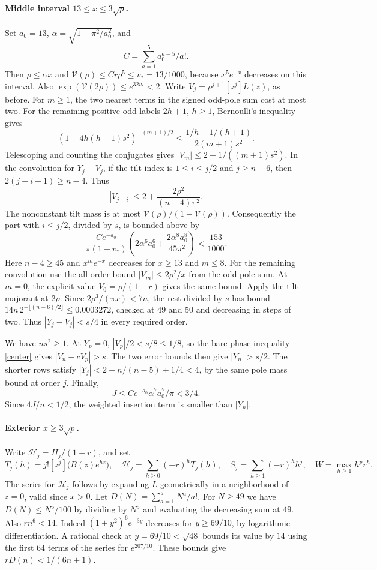 \paragraph{Middle interval \(13\le x\le3\sqrt p\).}
Set \(a_0=13\), \(\alpha=\sqrt{1+\pi^2/a_0^2}\), and
\[
 C=\sum_{a=1}^5 a_0^{a-5}/a! .
\]
Then \(\rho\le\alpha x\) and \(\mathcal V(\rho)\le Cr\rho^5\le v_\ast=13/1000\), because \(x^5e^{-x}\) decreases on this interval. Also \(\exp(\mathcal V(2\rho))\le e^{32v_\ast}<2\).
Write \(V_j=\rho^{j+1}[z^j]L(z)\), as before. For \(m\ge1\), the two nearest terms in the signed odd-pole sum cost at most two. For the remaining positive odd labels \(2h+1\), \(h\ge1\), Bernoulli's inequality gives
\[
 (1+4h(h+1)s^2)^{-(m+1)/2}
 \le \frac{1/h-1/(h+1)}{2(m+1)s^2}.
\]
Telescoping and counting the conjugates gives \(|V_m|\le2+1/((m+1)s^2)\). In the convolution for \(Y_j-V_j\), if the tilt index is \(1\le i\le j/2\) and \(j\ge n-6\), then \(2(j-i+1)\ge n-4\). Thus
\[
 |V_{j-i}|\le2+\frac{2\rho^2}{(n-4)\pi^2}.
\]
The nonconstant tilt mass is at most \(\mathcal V(\rho)/(1-\mathcal V(\rho))\). Consequently the part with \(i\le j/2\), divided by \(s\), is bounded above by
\[
 \frac{Ce^{-a_0}}{\pi(1-v_\ast)}
      \left(2\alpha^6 a_0^6+\frac{2\alpha^8 a_0^8}{45\pi^2}\right)
 <\frac{153}{1000}.
\]
Here \(n-4\ge45\) and \(x^m e^{-x}\) decreases for \(x\ge13\) and \(m\le8\). For the remaining convolution use the all-order bound \(|V_m|\le2\rho^2/x\) from the odd-pole sum. At \(m=0\), the explicit value \(V_0=\rho/(1+r)\) gives the same bound. Apply the tilt majorant at \(2\rho\). Since \(2\rho^3/(\pi x)<7n\), the rest divided by \(s\) has bound \(14n\,2^{-\lfloor(n-6)/2\rfloor}\le 0.0003272\), checked at 49 and 50 and decreasing in steps of two. Thus \(|Y_j-V_j|<s/4\) in every required order.

We have \(ns^2\ge1\). At \(Y_p=0\), \(|V_p|/2<s/8\le1/8\), so the bare phase inequality \eqref{center} gives \(|V_n-cV_p|>s\). The two error bounds then give \(|Y_n|>s/2\). The shorter rows satisfy \(|Y_j|<2+n/(n-5)+1/4<4\), by the same pole mass bound at order \(j\). Finally,
\[
 J\le Ce^{-a_0}\alpha^7 a_0^7/\pi<3/4 .
\]
Since \(4J/n<1/2\), the weighted insertion term is smaller than \(|Y_n|\).

\paragraph{Exterior \(x\ge3\sqrt p\).}
Write \(\mathcal H_j=H_j/(1+r)\), and set
\[
 T_j(h)=j![z^j]\bigl(B(z)e^{hz}\bigr),\quad
 \mathcal H_j=\sum_{h\ge0}(-r)^hT_j(h),\quad
 S_j=\sum_{h\ge1}(-r)^h h^j,\quad W=\max_{h\ge1}h^p r^h .
\]
The series for \(\mathcal H_j\) follows by expanding \(L\) geometrically in a neighborhood of \(z=0\), valid since \(x>0\). Let \(D(N)=\sum_{a=1}^5 N^a/a!\). For \(N\ge49\) we have \(D(N)\le N^5/100\) by dividing by \(N^5\) and evaluating the decreasing sum at \(49\). Also \(r n^6<14\). Indeed \((1+y^2)^6e^{-3y}\) decreases for \(y\ge69/10\), by logarithmic differentiation. A rational check at \(y=69/10<\sqrt{48}\) bounds its value by \(14\) using the first 64 terms of the series for \(e^{207/10}\). These bounds give \(rD(n)<1/(6n+1)\).

